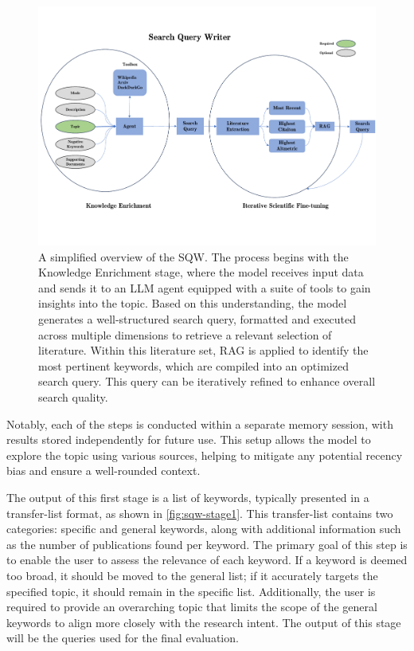 \begin{figure}
	\centering
	\includegraphics[scale=0.3]{pics/sqw-overview.pdf}
	\caption[Search Query Writer]{A simplified overview of the SQW. The process begins with the Knowledge Enrichment stage, where the model receives input data and sends it to an LLM agent equipped with a suite of tools to gain insights into the topic. Based on this understanding, the model generates a well-structured search query, formatted and executed across multiple dimensions to retrieve a relevant selection of literature. Within this literature set, RAG is applied to identify the most pertinent keywords, which are compiled into an optimized search query. This query can be iteratively refined to enhance overall search quality.}
	\label{fig:sqw-overview}
\end{figure}

Notably, each of the steps is conducted within a separate memory session, with results stored independently for future use. This setup allows the model to explore the topic using various sources, helping to mitigate any potential recency bias and ensure a well-rounded context.

The output of this first stage is a list of keywords, typically presented in a transfer-list format, as shown in \autoref{fig:sqw-stage1}. This transfer-list contains two categories: specific and general keywords, along with additional information such as the number of publications found per keyword. The primary goal of this step is to enable the user to assess the relevance of each keyword. If a keyword is deemed too broad, it should be moved to the general list; if it accurately targets the specified topic, it should remain in the specific list. Additionally, the user is required to provide an overarching topic that limits the scope of the general keywords to align more closely with the research intent. The output of this stage will be the queries used for the final evaluation.


